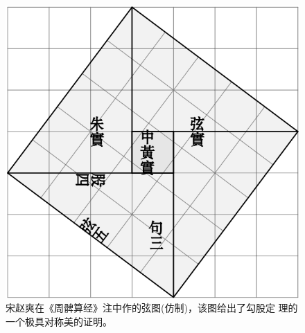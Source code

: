 \documentclass[UTF8]{ctexart}  %
\begin{document}
	\begin{figure}[ht]
		\centering
		\includegraphics[scale=0.4]{gougu.png}
		\caption {宋赵爽在《周髀算经》注中作的弦图(仿制)，该图给出了勾股定 理的一个极具对称美的证明。}
		\label{fig:20191004097}
	\end{figure}
	
	
\end{document}
